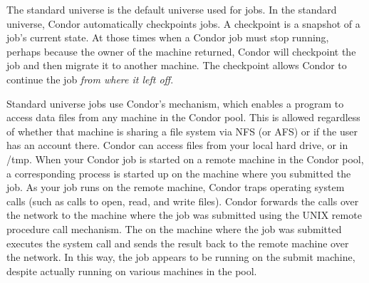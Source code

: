 The standard universe is the default universe used for jobs.
In the standard universe, Condor automatically checkpoints jobs.
A checkpoint is a snapshot of a job's current state.
At those times when a Condor job must stop running,
perhaps because the owner of the machine returned, Condor
will checkpoint the job and then migrate it to another machine.
The checkpoint allows Condor to continue the job
\emph{from where it left off}. 

Standard universe jobs use Condor's 
mechanism, which enables a program to access data files from
any machine in the Condor pool.
This is allowed regardless of whether that machine is
sharing a file system via NFS (or AFS) or if the user has an account
there. 
Condor can access files from your local hard drive, or in /tmp. 
When your Condor
job is started on a remote machine in the Condor pool,
a corresponding 
process
is started up on the machine where you submitted the job.
As your job runs on the remote machine,
Condor traps operating system calls (such as calls to open, read, and
write files). 
Condor forwards the calls over the network to the machine where
the job was submitted using the UNIX remote procedure call mechanism.
The  on the machine where the job was
submitted executes the system
call and sends the result back to the remote machine over the network.
In this way, the job appears to be
running on the submit machine, despite actually
running on various machines in the pool.

